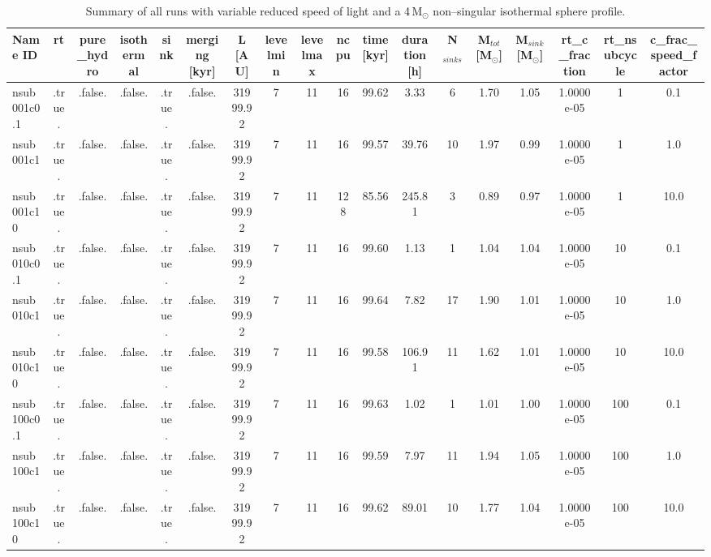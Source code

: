 \begin{table}
\begin{adjustbox}{width=1.8\textheight}
\begin{tabular}{lccccccccccccccccc}
\toprule
Name ID & rt & pure\_hydro & isothermal & sink & merging [kyr] & L [AU] & levelmin & levelmax & ncpu & time [kyr] & duration [h] & N$_{sinks}$ & M$_{tot}$ [M$_{\odot}$] & M$_{sink}$ [M$_{\odot}$] & rt\_c\_fraction & rt\_nsubcycle & c\_frac\_speed\_factor \\
\midrule
nsub001c0.1 & .true. & .false. & .false. & .true. & .false. & 31999.92 & 7 & 11 & 16 & 99.62 & 3.33 & 6 & 1.70 & 1.05 & 1.0000e-05 & 1 & 0.1 \\
nsub001c1 & .true. & .false. & .false. & .true. & .false. & 31999.92 & 7 & 11 & 16 & 99.57 & 39.76 & 10 & 1.97 & 0.99 & 1.0000e-05 & 1 & 1.0 \\
nsub001c10 & .true. & .false. & .false. & .true. & .false. & 31999.92 & 7 & 11 & 128 & 85.56 & 245.81 & 3 & 0.89 & 0.97 & 1.0000e-05 & 1 & 10.0 \\
nsub010c0.1 & .true. & .false. & .false. & .true. & .false. & 31999.92 & 7 & 11 & 16 & 99.60 & 1.13 & 1 & 1.04 & 1.04 & 1.0000e-05 & 10 & 0.1 \\
nsub010c1 & .true. & .false. & .false. & .true. & .false. & 31999.92 & 7 & 11 & 16 & 99.64 & 7.82 & 17 & 1.90 & 1.01 & 1.0000e-05 & 10 & 1.0 \\
nsub010c10 & .true. & .false. & .false. & .true. & .false. & 31999.92 & 7 & 11 & 16 & 99.58 & 106.91 & 11 & 1.62 & 1.01 & 1.0000e-05 & 10 & 10.0 \\
nsub100c0.1 & .true. & .false. & .false. & .true. & .false. & 31999.92 & 7 & 11 & 16 & 99.63 & 1.02 & 1 & 1.01 & 1.00 & 1.0000e-05 & 100 & 0.1 \\
nsub100c1 & .true. & .false. & .false. & .true. & .false. & 31999.92 & 7 & 11 & 16 & 99.59 & 7.97 & 11 & 1.94 & 1.05 & 1.0000e-05 & 100 & 1.0 \\
nsub100c10 & .true. & .false. & .false. & .true. & .false. & 31999.92 & 7 & 11 & 16 & 99.62 & 89.01 & 10 & 1.77 & 1.04 & 1.0000e-05 & 100 & 10.0 \\
\bottomrule
\end{tabular}
\end{adjustbox}
\caption[Variable speed of light runs]{Summary of all runs with variable reduced speed of light and a 4\,M$_{\odot}$ non--singular isothermal sphere profile.}
\label{tab:var_rt}
\end{table}
